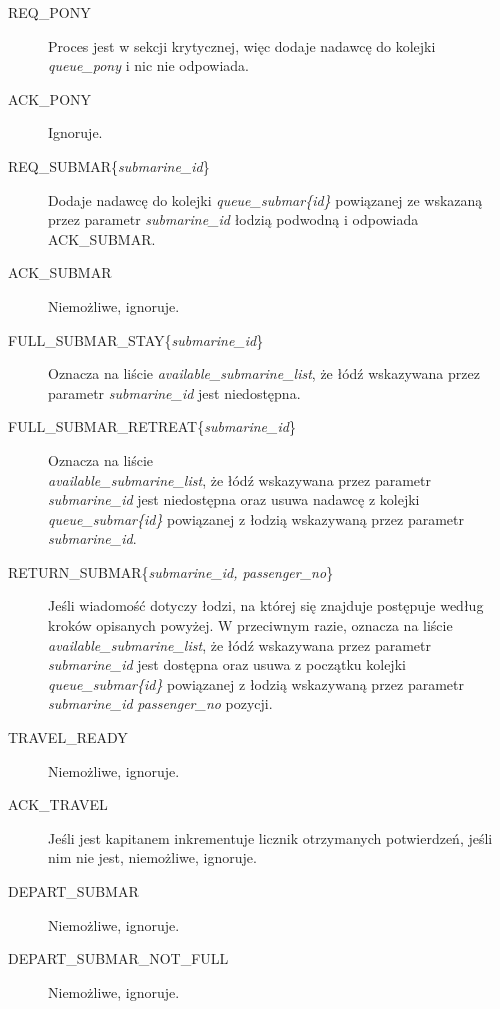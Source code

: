 \documentclass[a4paper]{article}
\begin{document}
\begin{description}
    \item [REQ\_PONY] Proces jest w sekcji krytycznej, więc dodaje nadawcę do kolejki \textit{queue\_pony} i nic nie odpowiada.
    \item [ACK\_PONY] Ignoruje.
    \item [REQ\_SUBMAR\{\textit{submarine\_id}\}] Dodaje nadawcę do kolejki \textit{queue\_submar\{id\}} powiązanej ze wskazaną przez parametr \textit{submarine\_id} łodzią podwodną i odpowiada ACK\_SUBMAR.
    \item [ACK\_SUBMAR] Niemożliwe, ignoruje.
    \item [FULL\_SUBMAR\_STAY\{\textit{submarine\_id}\}] Oznacza na liście \textit{available\_submarine\_list}, że łódź wskazywana przez parametr \textit{submarine\_id} jest niedostępna.
    \item [FULL\_SUBMAR\_RETREAT\{\textit{submarine\_id}\}] Oznacza na liście\\
     \textit{available\_submarine\_list}, że łódź wskazywana przez parametr \textit{submarine\_id} jest niedostępna oraz usuwa nadawcę z kolejki \textit{queue\_submar\{id\}} powiązanej z łodzią wskazywaną przez parametr \textit{submarine\_id}.
    \item [RETURN\_SUBMAR\{\textit{submarine\_id, passenger\_no}\}] Jeśli wiadomość dotyczy łodzi, na której się znajduje postępuje według kroków opisanych powyżej. W przeciwnym razie, oznacza na liście \textit{available\_submarine\_list}, że łódź wskazywana przez parametr \textit{submarine\_id} jest dostępna
    oraz usuwa z początku kolejki \textit{queue\_submar\{id\}} powiązanej z łodzią wskazywaną przez parametr \textit{submarine\_id} \textit{passenger\_no} pozycji.
    \item [TRAVEL\_READY] Niemożliwe, ignoruje.
    \item [ACK\_TRAVEL] Jeśli jest kapitanem inkrementuje licznik otrzymanych potwierdzeń, jeśli nim nie jest, niemożliwe, ignoruje.
    \item [DEPART\_SUBMAR] Niemożliwe, ignoruje.
    \item [DEPART\_SUBMAR\_NOT\_FULL] Niemożliwe, ignoruje.
\end{description}

\resetlinenumber[1]\linenumbers
\end{document}
